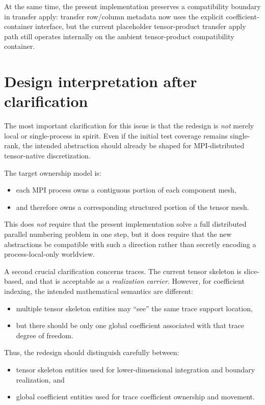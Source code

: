 \documentclass[11pt]{article}
\begin{document}
At the same time, the present implementation preserves a compatibility boundary in transfer apply: transfer row/column metadata now uses the explicit coefficient-container interface, but the current placeholder tensor-product transfer apply path still operates internally on the ambient tensor-product compatibility container.

\section{Design interpretation after clarification}

The most important clarification for this issue is that the redesign is \emph{not} merely local or single-process in spirit.  Even if the initial test coverage remains single-rank, the intended abstraction should already be shaped for MPI-distributed tensor-native discretization.

The target ownership model is:
\begin{itemize}[leftmargin=2em]
\item each MPI process owns a contiguous portion of each component mesh,
\item and therefore owns a corresponding structured portion of the tensor mesh.
\end{itemize}

This does \emph{not} require that the present implementation solve a full distributed parallel numbering problem in one step, but it does require that the new abstractions be compatible with such a direction rather than secretly encoding a process-local-only worldview.

A second crucial clarification concerns traces.  The current tensor skeleton is slice-based, and that is acceptable as a \emph{realization carrier}.  However, for coefficient indexing, the intended mathematical semantics are different:
\begin{itemize}[leftmargin=2em]
\item multiple tensor skeleton entities may ``see'' the same trace support location,
\item but there should be only one global coefficient associated with that trace degree of freedom.
\end{itemize}

Thus, the redesign should distinguish carefully between:
\begin{itemize}[leftmargin=2em]
\item tensor skeleton entities used for lower-dimensional integration and boundary realization, and
\item global coefficient entities used for trace coefficient ownership and movement.
\end{itemize}
\end{document}
